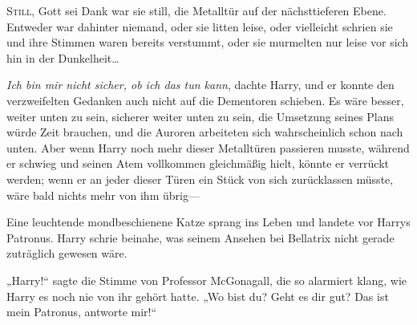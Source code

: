 
\lettrine{S}{till}, Gott sei Dank war sie still, die Metalltür auf der nächsttieferen Ebene. Entweder war dahinter niemand, oder sie litten leise, oder vielleicht schrien sie und ihre Stimmen waren bereits verstummt, oder sie murmelten nur leise vor sich hin in der Dunkelheit…

\emph{Ich bin mir nicht sicher, ob ich das tun kann}, dachte Harry, und er konnte den verzweifelten Gedanken auch nicht auf die Dementoren schieben. Es wäre besser, weiter unten zu sein, sicherer weiter unten zu sein, die Umsetzung seines Plans würde Zeit brauchen, und die Auroren arbeiteten sich wahrscheinlich schon nach unten. Aber wenn Harry noch mehr dieser Metalltüren passieren musste, während er schwieg und seinen Atem vollkommen gleichmäßig hielt, könnte er verrückt werden; wenn er an jeder dieser Türen ein Stück von sich zurücklassen müsste, wäre bald nichts mehr von ihm übrig—

Eine leuchtende mondbeschienene Katze sprang ins Leben und landete vor Harrys Patronus. Harry schrie beinahe, was seinem Ansehen bei Bellatrix nicht gerade zuträglich gewesen wäre.

„Harry!“ sagte die Stimme von Professor McGonagall, die so alarmiert klang, wie Harry es noch nie von ihr gehört hatte. „Wo bist du? Geht es dir gut? Das ist mein Patronus, antworte mir!“

